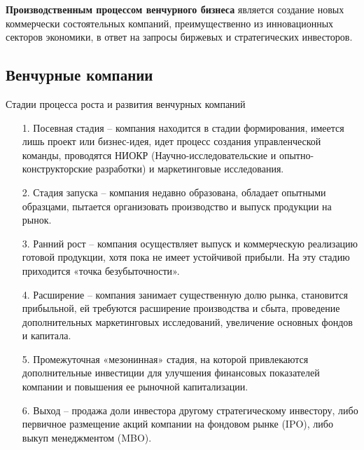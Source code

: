 \documentclass[_Venture_p1.tex]{subfiles}
\begin{document}
\begin{frame}
\textbf{Производственным процессом венчурного бизнеса }является создание новых коммерчески состоятельных компаний, преимущественно из инновационных секторов экономики, в ответ на запросы биржевых и стратегических инвесторов.
\end{frame}

\subsection{Венчурные компании}

\begin{frame}[allowframebreaks]{Стадии процесса роста и развития венчурных компаний}
\begin{itemize}
	\item[1.] Посевная стадия – компания находится в стадии формирования, имеется лишь проект или бизнес-идея, идет процесс создания управленческой команды, проводятся НИОКР (Научно-исследовательские и опытно-конструкторские разработки) и маркетинговые исследования.
	\item[2.] Стадия запуска – компания недавно образована, обладает опытными образцами, пытается организовать производство и выпуск продукции на рынок.
	
	\pagebreak
	\item[3.] Ранний рост – компания осуществляет выпуск и коммерческую реализацию готовой продукции, хотя пока не имеет устойчивой прибыли. На эту стадию приходится «точка безубыточности».
	\item[4.] Расширение – компания занимает существенную долю рынка, становится прибыльной, ей требуются расширение производства и сбыта, проведение дополнительных маркетинговых исследований, увеличение основных фондов и капитала.
	
	\pagebreak
	\item[5.] Промежуточная «мезонинная» стадия, на которой привлекаются дополнительные инвестиции  для улучшения финансовых показателей компании и повышения ее рыночной капитализации.
	\item[6.] Выход – продажа доли инвестора другому стратегическому инвестору, либо первичное размещение акций компании на фондовом рынке (IPO), либо выкуп менеджментом (MBO). 
\end{itemize}
\end{frame}
\end{document}
